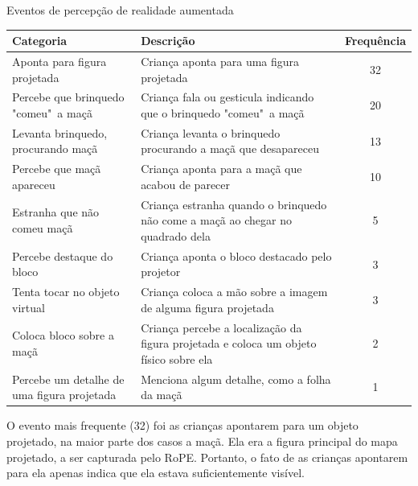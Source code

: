 \begin{quadro}[!h]
    \begin{table_env}
    \caption{Eventos de percepção de realidade aumentada}
     \label{quadro:percepcao_ra}
     \begin{tabular}{@{}l m{} c@{}}
        \toprule
        Categoria                                      & Descrição                                                                             & Frequência \\ \midrule
        Aponta para figura projetada                   & Criança aponta para uma figura projetada                                              & 32 \\
        Percebe que brinquedo "comeu"\ a maçã           & Criança fala ou gesticula indicando que o brinquedo "comeu"\ a maçã                   & 20 \\
        Levanta brinquedo, procurando maçã             & Criança levanta o brinquedo procurando a maçã que desapareceu                         & 13 \\
        Percebe que maçã apareceu                      & Criança aponta para a maçã que acabou de parecer                                      & 10 \\
        Estranha que não comeu maçã                    & Criança estranha quando o brinquedo não come a maçã ao chegar no quadrado dela        & 5 \\
        Percebe destaque do bloco                      & Criança aponta o bloco destacado pelo projetor                                        & 3 \\
        Tenta tocar no objeto virtual                  & Criança coloca a mão sobre a imagem de alguma figura projetada                        & 3 \\
        Coloca bloco sobre a maçã                      & Criança percebe a localização da figura projetada e coloca um objeto físico sobre ela & 2 \\
        Percebe um detalhe de uma figura projetada     & Menciona algum detalhe, como a folha da maçã                                          & 1 \\ \bottomrule
        \end{tabular}
    \end{table_env}
    \sourceauthor
 \end{quadro}

O evento mais frequente (32) foi as crianças apontarem para um objeto projetado, na maior parte dos casos a maçã. Ela era a figura principal do mapa projetado, a ser capturada pelo RoPE. Portanto, o fato de as crianças apontarem para ela apenas indica que ela estava suficientemente visível.
 
